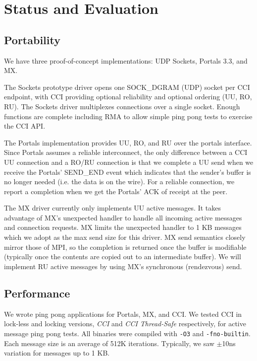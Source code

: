 \section{Status and Evaluation}
\label{sec:evaluation}

\subsection{Portability}
We have three proof-of-concept implementations: UDP Sockets, Portals 3.3, and MX.

The Sockets prototype driver opens one SOCK\_DGRAM (UDP) socket per
CCI endpoint, with CCI  providing optional reliability and optional
ordering (UU, RO, RU). 
The Sockets driver multiplexes connections over a single socket.
Enough functions are complete including RMA to allow simple ping pong
tests to exercise the CCI API.

The Portals implementation provides UU, RO, and RU over the portals
interface. Since Portals assumes a reliable interconnect, the
only difference between a CCI UU connection and a RO/RU connection is that we
complete a UU send when we receive the Portals' SEND\_END event which indicates
that the sender's buffer is no longer needed (i.e. the data is on the wire).
For a reliable connection, we report a completion when we get the Portals' ACK
of receipt at the peer.

The MX driver currently only implements UU active messages.  It takes advantage of
MX's unexpected handler to handle all incoming active messages and connection
requests. MX limits the unexpected handler to 1 KB messages which we adopt as the max
send size for this driver. MX send semantics closely mirror those of MPI, so the
completion is returned once the buffer is modifiable (typically once the contents are
copied out to an intermediate buffer). We will implement RU active messages by using
MX's synchronous (rendezvous) send.

\subsection{Performance}
We wrote ping pong applications for Portals, MX, and CCI.  We tested CCI in lock-less
and locking versions, \emph{CCI} and \emph{CCI Thread-Safe} respectively, for active
message ping pong tests. All binaries were compiled with \texttt{-O3} and
\texttt{-fno-builtin}. Each message size is an average of 512K iterations. Typically,
we saw $\pm$10ns variation for messages up to 1 KB.

